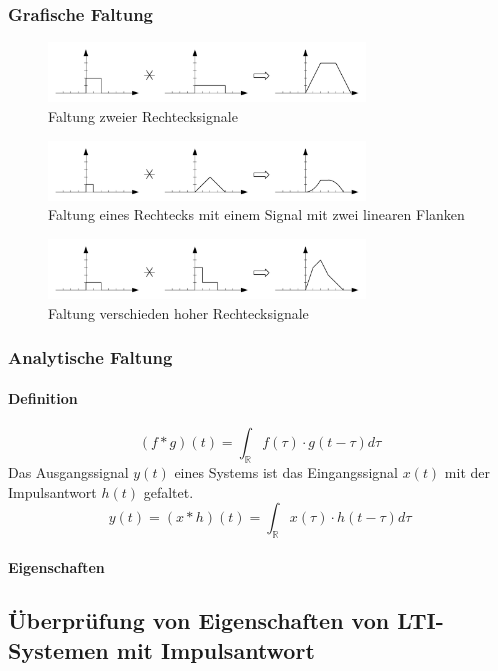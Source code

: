 \documentclass[10pt,a4paper]{article}
\begin{document}
\subsubsection*{Grafische Faltung}
\begin{figure}[H]
	\centering
	\includegraphics[width=0.75\textwidth]{img/faltung1.pdf}
	\caption*{Faltung zweier Rechtecksignale}
\end{figure}
\begin{figure}[H]
	\centering
	\includegraphics[width=0.75\textwidth]{img/faltung2.pdf}
	\caption*{Faltung eines Rechtecks mit einem Signal mit zwei linearen Flanken}
\end{figure}
\begin{figure}[H]
	\centering
	\includegraphics[width=0.75\textwidth]{img/faltung3.pdf}
	\caption*{Faltung verschieden hoher Rechtecksignale}
\end{figure}
\subsubsection*{Analytische Faltung}
\paragraph*{Definition}
\[ (f \ast g)(t)=\int_\mathbb{R}f(\tau)\cdot g(t-\tau) d\tau \]
Das Ausgangssignal $y(t)$ eines Systems ist das Eingangssignal $x(t)$ mit der Impulsantwort $h(t)$ gefaltet.
\[ y(t) = (x \ast h)(t)=\int_\mathbb{R}x(\tau)\cdot h(t-\tau) d\tau\]
\paragraph*{Eigenschaften}
\subsection*{Überprüfung von Eigenschaften von LTI-Systemen mit Impulsantwort}
\newpage
\end{document}

